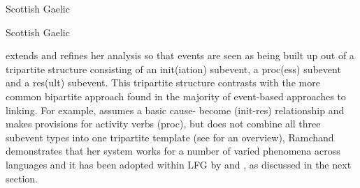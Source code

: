 \documentclass[output=paper,hidelinks]{langscibook}
\begin{document}
\begin{exe}
  \ex \label{ex:sgaelic}
Scottish Gaelic
  \begin{xlist}

\end{xlist}
\end{exe}

\begin{exe}
  \ex \label{ex:sgaelic-want}
Scottish Gaelic
  \begin{xlist}

\end{xlist}
\end{exe}
\citet{ramchand08} extends and refines her analysis so that events are seen as
being built up out of a tripartite structure consisting of  an init(iation) subevent, a
proc(ess) subevent and a res(ult) subevent.  This tripartite structure contrasts with the more common
bipartite approach found in the majority of event-based approaches to linking.
For example, \citet{jackendoff1990semantic} assumes a basic {\sc cause}-{\sc
  become} (init-res) relationship and makes provisions for activity verbs (proc), but does not combine
all  three subevent types into one tripartite template (see \citealt{levin-hovav05} for an overview),
Ramchand demonstrates that
her system works for a number of varied phenomena across languages and it has
been adopted within LFG by  \citet{schaetzle18} and \citet{beck-butt2021}, as
discussed in the next section. 
\end{document}
